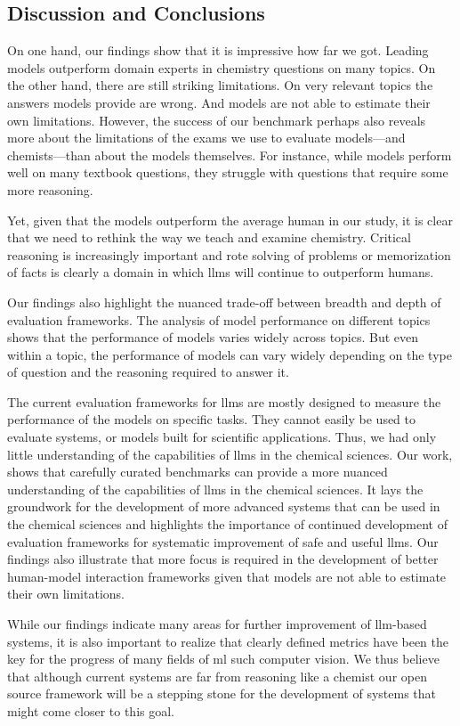 \documentclass[11pt, oneside]{article}
\begin{document}
\begin{refsection}
\section{Discussion and Conclusions}
On one hand, our findings show that it is impressive how far we got. Leading models outperform domain experts in chemistry questions on many topics. 
On the other hand, there are still striking limitations. On very relevant topics the answers models provide are wrong. And models are not able to estimate their own limitations.
However, the success of our benchmark perhaps also reveals more about the limitations of the exams we use to evaluate models---and chemists---than about the models themselves.
For instance, while models perform well on many textbook questions, they struggle with questions that require some more reasoning.

Yet, given that the models outperform the average human in our study, it is clear that we need to rethink the way we teach and examine chemistry.
Critical reasoning is increasingly important and rote solving of problems or memorization of facts is clearly a domain in which \glspl{llm} will continue to outperform humans.

Our findings also highlight the nuanced trade-off between breadth and depth of evaluation frameworks. 
The analysis of model performance on different topics shows that the performance of models varies widely across topics. 
But even within a topic, the performance of models can vary widely depending on the type of question and the reasoning required to answer it.

The current evaluation frameworks for \glspl{llm} are mostly designed to measure the performance of the models on specific tasks. 
They cannot easily be used to evaluate systems, or models built for scientific applications. Thus, we had only little understanding of the capabilities of \glspl{llm} in the chemical sciences.
Our work, shows that carefully curated benchmarks can provide a more nuanced understanding of the capabilities of \glspl{llm} in the chemical sciences.
It lays the groundwork for the development of more advanced systems that can be used in the chemical sciences and highlights the importance of continued development of evaluation frameworks for systematic improvement of safe and useful \glspl{llm}.
Our findings also illustrate that more focus is required in the development of better human-model interaction frameworks given that models are not able to estimate their own limitations.

While our findings indicate many areas for further improvement of \gls{llm}-based systems, it is also important to realize that clearly defined metrics have been the key for the progress of many fields of \gls{ml} such computer vision. 
We thus believe that although current systems are far from reasoning like a chemist our open source \chembench framework will be a stepping stone for the development of systems that might come closer to this goal.


\end{refsection}
\end{document}
